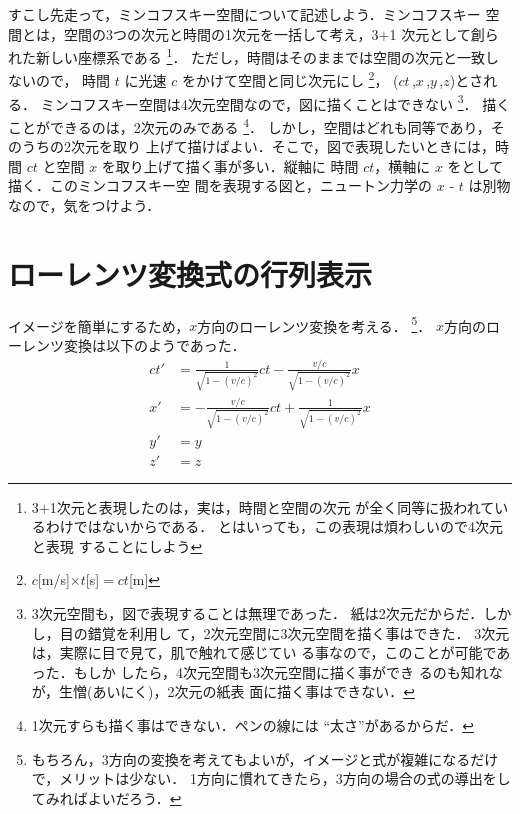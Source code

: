     すこし先走って，ミンコフスキー空間について記述しよう．ミンコフスキー
    空間とは，空間の3つの次元と時間の1次元を一括して考え，3$+$1
    次元として創られた新しい座標系である
        \footnote{
            3$+$1次元と表現したのは，実は，時間と空間の次元
            が全く同等に扱われているわけではないからである．
            とはいっても，この表現は煩わしいので4次元と表現
            することにしよう
        }．
    ただし，時間はそのままでは空間の次元と一致しないので，
    時間 $t$ に光速 $c$ をかけて空間と同じ次元にし
        \footnote{
            $c$[m/s]$\times t$[s]$=ct$[m]
        }，
    ($ct$\,,$x$\,,$y$\,,$z$)とされる．
    ミンコフスキー空間は4次元空間なので，図に描くことはできない
        \footnote{
            3次元空間も，図で表現することは無理であった．
            紙は2次元だからだ．しかし，目の錯覚を利用し
            て，2次元空間に3次元空間を描く事はできた．
            3次元は，実際に目で見て，肌で触れて感じてい
            る事なので，このことが可能であった．もしか
            したら，4次元空間も3次元空間に描く事ができ
            るのも知れなが，生憎(あいにく)，2次元の紙表
            面に描く事はできない．
        }．
    描くことができるのは，2次元のみである
        \footnote{
            1次元すらも描く事はできない．ペンの線には
            “太さ”があるからだ．
        }．
    しかし，空間はどれも同等であり，そのうちの2次元を取り
    上げて描けばよい．そこで，図で表現したいときには，時
    間 $ct$ と空間 $x$ を取り上げて描く事が多い．縦軸に
    時間 $ct$，横軸に $x$ をとして描く．このミンコフスキー空
    間を表現する図と，ニュートン力学の $x$ - $t$ は別物
    なので，気をつけよう．

\section{ローレンツ変換式の行列表示}\label{sec:Lorentz_trans_by_matrix}
    イメージを簡単にするため，$x$方向のローレンツ変換を考える．
        \footnote{
            もちろん，3方向の変換を考えてもよいが，イメージと式が複雑になるだけで，メリットは少ない．
            1方向に慣れてきたら，3方向の場合の式の導出をしてみればよいだろう．
        }．
    $x$方向のローレンツ変換は以下のようであった．
    \begin{align*}
        ct' &= \frac{1}{\sqrt{ 1-(v/c)^{2} }} ct -\frac{v/c}{\sqrt{ 1-(v/c)^{2} }} x \\
        x'  &= -\frac{v/c}{\sqrt{ 1-(v/c)^{2} }}ct+\frac{1}{\sqrt{ 1-(v/c)^{2} }} x \\
        y'  &= y \\
        z'  &= z
    \end{align*}


